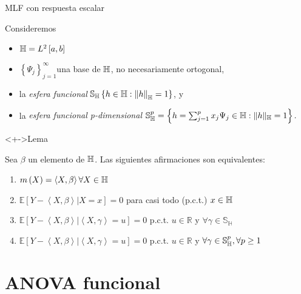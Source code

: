 \documentclass[10pt,spanish,handout]{beamer}\usepackage[]{graphicx}\usepackage[]{color}
\begin{document}
\begin{frame}{MLF con respuesta escalar}

Consideremos
\begin{itemize}[<+->]
\item $\mathbb{H}=L^{2}\left[a,b\right]$
\item $\left\{ \Psi_{j}\right\} _{j=1}^{\infty}$una base de $\mathbb{H}$, no necesariamente
ortogonal,
\item la \emph{esfera funcional} $\mathbb{S_{H}}\left\{ h\in\mathbb{H}:\left\Vert h\right\Vert _{\mathbb{H}}=1\right\} $,
y
\item la \emph{esfera funcional p-dimensional $\mathbb{S}_{\mathbb{H}}^{p}=\left\{ h=\sum_{j=1}^{p}x_{j}\Psi_{j}\in\mathbb{H}:\|h\|_{\mathbb{H}}=1\right\} $. }
\end{itemize}
\begin{exampleblock}<+->{Lema \cite{Patilea 2012}}

Sea $\beta$ un elemento de $\mathbb{H}$. Las siguientes afirmaciones son
equivalentes:
\begin{enumerate}[<+->]
\item $m\left(X\right)=\left\langle X,\beta\right\rangle \forall X\in\mathbb{H}$
\item $\mathbb{E}\left[Y-\left\langle X,\beta\right\rangle |X=x\right]=0$
para casi todo (p.c.t.) $x\in\mathbb{H}$
\item $\mathbb{E}\left[Y-\left\langle X,\beta\right\rangle |\left\langle X,\gamma\right\rangle =u\right]=0$
p.c.t. $u\in\mathbb{R}$ y $\forall\gamma\in\mathbb{S_{H}}$
\item $\mathbb{E}\left[Y-\left\langle X,\beta\right\rangle |\left\langle X,\gamma\right\rangle =u\right]=0$
p.c.t. $u\in\mathbb{R}$ y $\forall\gamma\in\mathbb{S}_{\mathbb{H}}^{p},\forall p\geq1$
\end{enumerate}
\end{exampleblock}
\end{frame}

\section[ANOVA funcional]{ANOVA funcional }
\end{document}

